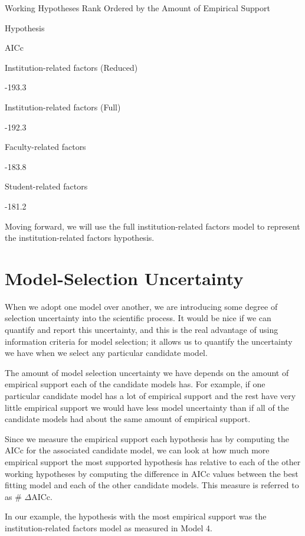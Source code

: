\documentclass[]{book}
\begin{document}
\label{tab:unnamed-chunk-182}Working Hypotheses Rank Ordered by the Amount of Empirical Support

Hypothesis

AICc

Institution-related factors (Reduced)

-193.3

Institution-related factors (Full)

-192.3

Faculty-related factors

-183.8

Student-related factors

-181.2

Moving forward, we will use the full institution-related factors model to represent the institution-related factors hypothesis.

\hypertarget{model-selection-uncertainty}{%
\section{Model-Selection Uncertainty}\label{model-selection-uncertainty}}

When we adopt one model over another, we are introducing some degree of selection uncertainty into the scientific process. It would be nice if we can quantify and report this uncertainty, and this is the real advantage of using information criteria for model selection; it allows us to quantify the uncertainty we have when we select any particular candidate model.

The amount of model selection uncertainty we have depends on the amount of empirical support each of the candidate models has. For example, if one particular candidate model has a lot of empirical support and the rest have very little empirical support we would have less model uncertainty than if all of the candidate models had about the same amount of empirical support.

Since we measure the empirical support each hypothesis has by computing the AICc for the associated candidate model, we can look at how much more empirical support the most supported hypothesis has relative to each of the other working hypotheses by computing the difference in AICc values between the best fitting model and each of the other candidate models. This measure is referred to as \# \(\Delta\)AICc.

In our example, the hypothesis with the most empirical support was the institution-related factors model as measured in Model 4.
\end{document}

